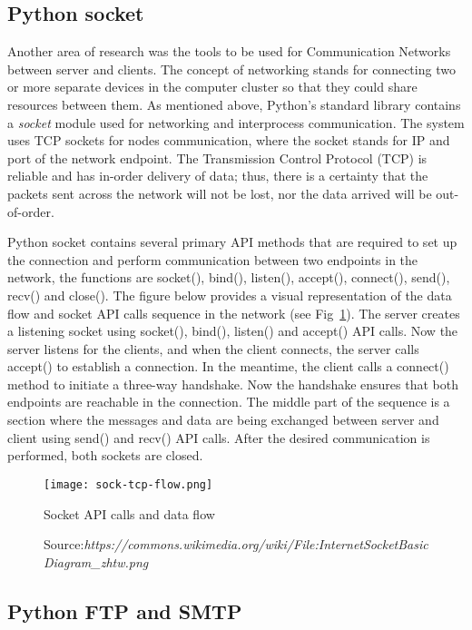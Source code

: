 \documentclass[10pt]{report}
\begin{document}
\subsection{Python socket}

Another area of research was the tools to be used for Communication Networks between server and clients. The concept of networking stands for connecting two or more separate devices in the computer cluster so that they could share resources between them. As mentioned above, Python's standard library contains a \textit{socket} module used for networking and interprocess communication. The system uses TCP sockets for nodes communication, where the socket stands for IP and port of the network endpoint. The Transmission Control Protocol (TCP) is reliable and has in-order delivery of data; thus, there is a certainty that the packets sent across the network will not be lost, nor the data arrived will be out-of-order.
\newline

Python socket contains several primary API methods that are required to set up the connection and perform communication between two endpoints in the network, the functions are socket(), bind(), listen(), accept(), connect(), send(), recv() and close(). The figure below provides a visual representation of the data flow and socket API calls sequence in the network (see Fig~\ref{fig:socketflow}). The server creates a listening socket using socket(), bind(), listen() and accept() API calls. Now the server listens for the clients, and when the client connects, the server calls accept() to establish a connection.
In the meantime, the client calls a connect() method to initiate a three-way handshake. Now the handshake ensures that both endpoints are reachable in the connection. The middle part of the sequence is a section where the messages and data are being exchanged between server and client using send() and recv() API calls. After the desired communication is performed, both sockets are closed.

\begin{figure}[htp]
    \centering
    \texttt{[image: sock-tcp-flow.png]}
    \caption{Socket API calls and data flow}
    \label{fig:socketflow}
    \caption*{Source:\textit{https://commons.wikimedia.org/wiki/File:InternetSocketBasicDiagram\_zhtw.png}}
\end{figure}

\subsection{Python FTP and SMTP}
\end{document}
